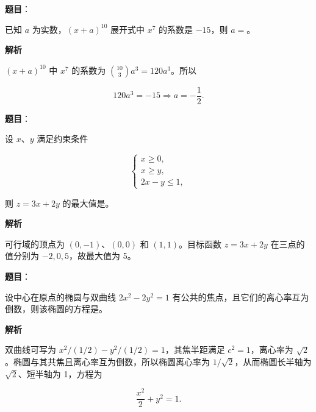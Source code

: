 \begin{answer}

\textbf{题目}：

已知 $a$ 为实数，$(x+a)^{10}$ 展开式中 $x^7$ 的系数是 $-15$，则 $a=$\gkblank{}。

\textbf{解析}

$(x+a)^{10}$ 中 $x^7$ 的系数为 $\binom{10}{3}a^3=120a^3$。所以

\nopagebreak[4]
\[
120a^3=-15\Longrightarrow a=-\frac12.
\]


\end{answer}
\begin{answer}

\textbf{题目}：

设 $x\text{、}y$ 满足约束条件

\nopagebreak[4]
\[
\begin{cases}
x\geqslant0,\\
x\geqslant y,\\
2x-y\leqslant1,
\end{cases}
\]

则 $z=3x+2y$ 的最大值是\gkblank{}。

\textbf{解析}

可行域的顶点为 $(0,-1)$、$(0,0)$ 和 $(1,1)$。目标函数 $z=3x+2y$ 在三点的值分别为 $-2,0,5$，故最大值为 5。


\end{answer}
\begin{answer}

\textbf{题目}：

设中心在原点的椭圆与双曲线 $2x^2-2y^2=1$ 有公共的焦点，且它们的离心率互为倒数，则该椭圆的方程是\gkblank{}。

\textbf{解析}

双曲线可写为 $x^2/(1/2)-y^2/(1/2)=1$，其焦半距满足 $c^2=1$，离心率为 $\sqrt2$。椭圆与其共焦且离心率互为倒数，所以椭圆离心率为 $1/\sqrt2$，从而椭圆长半轴为 $\sqrt2$、短半轴为 1，方程为

\nopagebreak[4]
\[
\frac{x^2}{2}+y^2=1.
\]


\end{answer}
